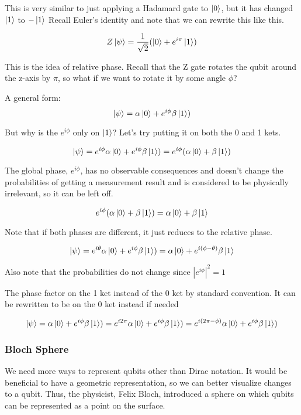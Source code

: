 \documentclass[12pt]{article}
\begin{document}
This is very similar to just applying a Hadamard gate to $\ket{0}$, but it has changed $\ket{1}$ to $-\ket{1}$ Recall Euler's identity and note that we can rewrite this like this.

$$
Z\ket{\psi} = \frac{1}{\sqrt{2}}( \ket{0} + e^{i\pi}\ket{1})
$$

This is the idea of relative phase. Recall that the Z gate rotates the qubit around the z-axis by $\pi$, so what if we want to rotate it by some angle $\phi$? 

A general form:
$$
\ket{\psi} = \alpha \ket{0} + e^{i\phi} \beta \ket{1})
$$

But why is the $e^{i\phi}$ only on $\ket{1}$? Let's try putting it on both the 0 and 1 kets.

$$
\ket{\psi} = e^{i\phi} \alpha \ket{0} + e^{i\phi} \beta \ket{1}) = e^{i\phi}(\alpha \ket{0} + \beta \ket{1})
$$

The global phase, $e^{i\phi}$, has no observable consequences and doesn't change the probabilities of getting a measurement result and is considered to be physically irrelevant, so it can be left off.\cite{Quantum_Information}

$$e^{i\phi}(\alpha \ket{0} + \beta \ket{1}) = \alpha \ket{0} + \beta \ket{1}$$




Note that if both phases are different, it just reduces to the relative phase.

$$
\ket{\psi} = e^{i\theta} \alpha \ket{0} + e^{i\phi} \beta \ket{1}) = \alpha \ket{0} + e^{i(\phi-\theta)}\beta \ket{1}
$$

Also note that the probabilities do not change since $|e^{i\phi}|^2 = 1$

The phase factor on the 1 ket instead of the 0 ket by standard convention. It can be rewritten to be on the 0 ket instead if needed

$$
\ket{\psi} = \alpha \ket{0} + e^{i\phi} \beta \ket{1}) = e^{i2\pi} \alpha \ket{0} + e^{i\phi} \beta \ket{1}) = e^{i(2\pi - \phi)} \alpha \ket{0} + e^{i\phi} \beta \ket{1})
$$


\subsubsection{Bloch Sphere}

We need more ways to represent qubits other than Dirac notation. It would be beneficial to have a geometric representation, so we can better visualize changes to a qubit. Thus, the physicist, Felix Bloch, introduced a sphere on which qubits can be represented as a point on the surface.
\end{document}
